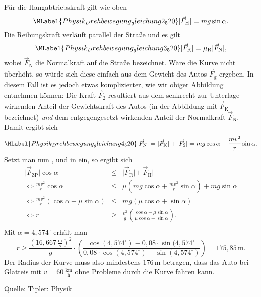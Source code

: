 \begin{MExercises}
\begin{MExercise}
\begin{MSolution}
  
   F\"ur die Hangabtriebskraft gilt wie oben
  \begin{equation}\MLabel{Physik_Drehbewegung_gleichung2_520}
  \vert\vec{F}_{\textrm{H}}\vert=mg\sin\alpha. 
  \end{equation}Die Reibungskraft verl\"auft parallel der Stra{\ss}e und es gilt
  \begin{equation}\MLabel{Physik_Drehbewegung_gleichung3_520}
  \vert\vec{F}_{\textrm{R}}\vert=\mu_{\textrm{R}} \vert\vec{F}_{\textrm{N}}\vert,
  \end{equation} wobei $\vec{F}_{\textrm{N}}$ die Normalkraft auf die Stra{\ss}e bezeichnet. W\"are die Kurve nicht \"uberh\"oht, so w\"urde sich diese einfach aus dem Gewicht des Autos $\vec{F}_{\textrm{g}}$ ergeben. In diesem Fall ist es jedoch etwas komplizierter, wie wir obiger Abbildung entnehmen k\"onnen: Die Kraft $\vec{F}_{\textrm{2}}$ resultiert aus dem senkrecht zur Unterlage wirkenden Anteil der Gewichtskraft des Autos (in der Abbildung mit $\vec{F}_{\textrm{K}}$ bezeichnet) \emph{und} dem entgegengesetzt wirkenden Anteil der Normalkraft $\vec{F}_{\textrm{N}}$. Damit ergibt sich
  \begin{equation}\MLabel{Physik_Drehbewegung_gleichung4_520}
  \vert\vec{F}_{\textrm{N}}\vert=\vert\vec{F}_{\textrm{K}}\vert+\vert\vec{F}_{\textrm{2}}\vert=mg\cos\alpha+\frac{mv^2}{r}\sin\alpha.
  \end{equation} Setzt man nun ,  und  in  ein, so ergibt sich
  \begin{eqnarray*}
  \vert\vec{F}_{\textrm{ZP}}\vert\cos\alpha&\le&\vert\vec{F}_{\textrm{R}}\vert+\vert\vec{F}_{\textrm{H}}\vert\\
  \Leftrightarrow \frac{mv^2}{r}\cos\alpha&\le& \mu\left(mg\cos\alpha+\frac{mv^2}{r}\sin\alpha\right)+mg\sin\alpha\\
  \Leftrightarrow \frac{mv^2}{r}\left(\cos\alpha-\mu\sin\alpha\right)&\le& mg\left(\mu\cos\alpha+\sin\alpha\right) \\
  \Leftrightarrow r&\ge& \frac{v^2}{g}\left(\frac{\cos\alpha-\mu\sin\alpha}{\mu\cos\alpha+\sin\alpha}\right).\\
  \end{eqnarray*} Mit $\alpha= 4{,}574^{\circ}$ erh\"alt man
  $$
  r\ge \frac{\left(16{,}667\,\frac{\text{m}}{\text{s}}\right)^2}{g}\cdot\left(\frac{\cos(4{,}574^{\circ})-0{,}08\cdot\sin(4{,}574^{\circ}}
  {0{,}08\cdot\cos(4{,}574^{\circ})+\sin(4{,}574^{\circ})}\right)
  =175,85\,\text{m}.
  $$ Der Radius der Kurve muss also mindestens $176\,\text{m}$ betragen, dass das Auto bei Glatteis mit $v=60\,\frac{\text{km}}{\text{h}}$ ohne Probleme durch die Kurve fahren kann.
  \end{MSolution}
  
  Quelle: Tipler: Physik
  \end{MExercise}
  
  \end{MExercises}
  
  \MPrintIndex
  
  
